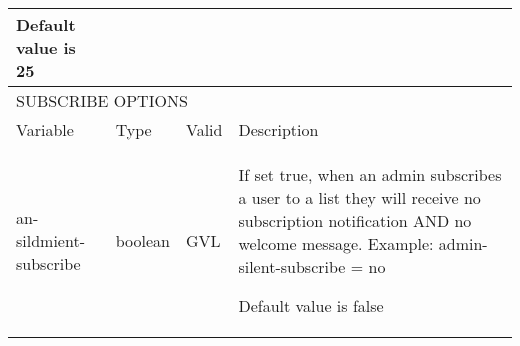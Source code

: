 \documentclass{book}
\begin{document}
\begin{longtable}{p{30mm}llp{60mm}}
Default value is 25\\
\hline
\multicolumn{4}{l}{SUBSCRIBE OPTIONS}\\
\hline
Variable & Type & Valid & Description\\
\hline
an-sildmient-subscribe & boolean & GVL & If set true, when an admin subscribes a user to a list they
will receive no subscription notification AND no welcome message.
Example: admin-silent-subscribe = no

Default value is false\\
\hline



\end{longtable}
\end{document}
